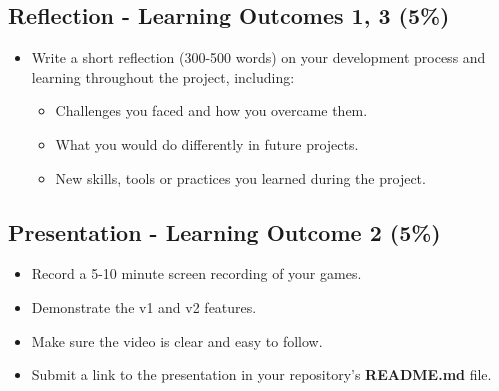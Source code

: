 \documentclass{article}
\begin{document}
\subsection*{Reflection - Learning Outcomes 1, 3 (5\%)}
\begin{itemize}
  \item Write a short reflection (300-500 words) on your development process and learning throughout the project, including:
  \begin{itemize}
    \item Challenges you faced and how you overcame them.
    \item What you would do differently in future projects.
    \item New skills, tools or practices you learned during the project.
  \end{itemize}
\end{itemize}

\subsection*{Presentation - Learning Outcome 2 (5\%)}
\begin{itemize}
  \item Record a 5-10 minute screen recording of your games.
  \item Demonstrate the v1 and v2 features.
  \item Make sure the video is clear and easy to follow.
  \item Submit a link to the presentation in your repository's \textbf{README.md} file.
\end{itemize}
\end{document}
